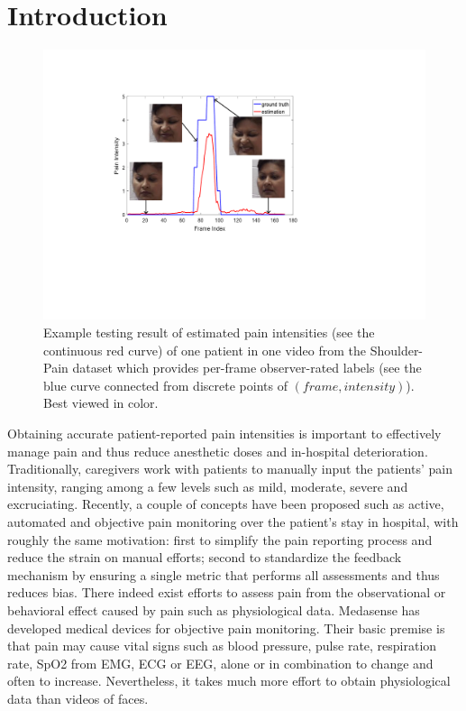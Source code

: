 \documentclass{article}
\begin{document}
\section{Introduction}

\begin{figure}[!t]
    \centering
    \includegraphics[scale=0.6]{figures/curve.pdf}
    \caption{Example testing result of estimated pain intensities (see the continuous red curve) of one patient in one video from the Shoulder-Pain dataset \cite{lucey2011painful} which provides per-frame observer-rated labels (see the blue curve connected from discrete points of $(frame, intensity)$). Best viewed in color. }
    \label{fig:curve}
\end{figure}
\vspace{-2mm}

Obtaining accurate patient-reported pain intensities is important to effectively manage pain and thus reduce anesthetic doses and in-hospital deterioration.
Traditionally, caregivers work with patients to manually input the patients' pain intensity, 
ranging among a few levels such as mild, moderate, severe and excruciating.
Recently, a couple of concepts have been proposed such as active, automated and objective pain monitoring
over the patient's stay in hospital, with roughly the same motivation:
first to simplify the pain reporting process and reduce the strain on manual efforts;
second to standardize the feedback mechanism by ensuring a single metric that performs all assessments and thus reduces bias.
There indeed exist efforts to assess pain from the observational or behavioral effect caused by pain such as physiological data. \textcopyright Medasense has developed medical devices for objective pain monitoring. 
Their basic premise is that pain may cause vital signs such as blood pressure, pulse rate, respiration rate, SpO2 from EMG, ECG or EEG, alone or in combination to change and often to increase.
Nevertheless, it takes much more effort to obtain physiological data than videos of faces.
\end{document}
